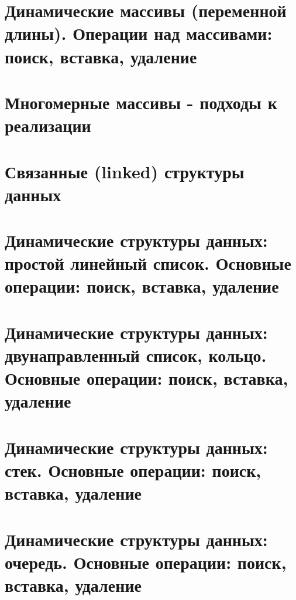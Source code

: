 \section{Динамические массивы (переменной длины). Операции над массивами: поиск, вставка, удаление}
\section{Многомерные массивы - подходы к реализации}
\section{Связанные (linked) структуры данных}
\section{Динамические структуры данных: простой линейный список. Основные операции: поиск, вставка, удаление}
\section{Динамические структуры данных: двунаправленный список, кольцо. Основные операции: поиск, вставка, удаление}
\section{Динамические структуры данных: стек. Основные операции: поиск, вставка, удаление}
\section{Динамические структуры данных: очередь. Основные операции: поиск, вставка, удаление}
